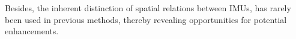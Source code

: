 \documentclass[letterpaper]{article} %
\begin{document}
Besides, the inherent distinction of spatial relations between IMUs, has rarely been used in previous methods, thereby revealing opportunities for potential enhancements.

\end{document}
